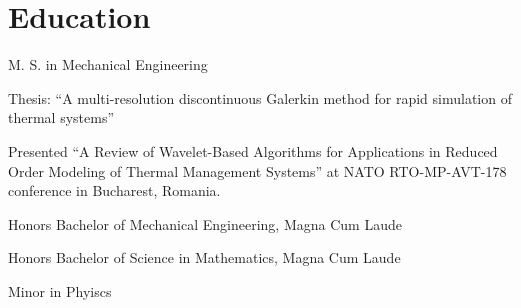 \section{Education}
%
\begin{position}
  \begin{myitem}
  \item M. S. in Mechanical Engineering
  \item Thesis: ``A multi-resolution discontinuous Galerkin method for rapid simulation of thermal systems''
  \item Presented ``A Review of Wavelet-Based Algorithms for Applications in Reduced Order Modeling of Thermal Management Systems'' at NATO RTO-MP-AVT-178 conference in Bucharest, Romania.
  \end{myitem}
  \begin{myitem}
  \item Honors Bachelor of Mechanical Engineering, Magna Cum Laude
  \item Honors Bachelor of Science in Mathematics, Magna Cum Laude
  \item Minor in Phyiscs
  \end{myitem}
\end{position}
